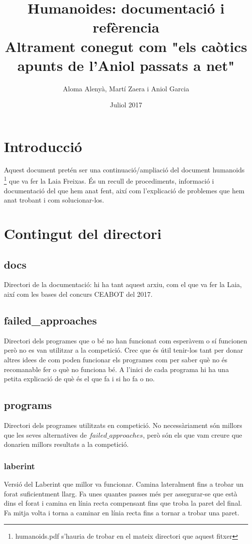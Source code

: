 \documentclass{article}
\title{Humanoides: documentació i refèrencia \\ \small{Altrament conegut com "els caòtics apunts de l'Aniol passats a net"}}
\author{Aloma Alenyà, Martí Zaera i Aniol Garcia}
\date{Juliol 2017}
\begin{document}
\maketitle
\section{Introducció}
Aquest document pretén ser una continuació/ampliació del document humanoids \footnote{humanoids.pdf s'hauria de trobar en el mateix directori que aquest fitxer} que va fer la Laia Freixas. És un recull de procediments, informació i documentació del que hem anat fent, així com l'explicació de problemes que hem anat trobant i com solucionar-los. 
\section{Contingut del directori}
\subsection{docs}
Directori de la documentació: hi ha tant aquest arxiu, com el que va fer la Laia, així com les bases del concurs CEABOT del 2017.
\subsection{failed\_approaches}
Directori dels programes que o bé no han funcionat com esperàvem o sí funcionen però no es van utilitzar a la competició. Crec que és útil tenir-los tant per donar altres idees de com poden funcionar els programes com per saber què no és recomanable fer o què no funciona bé. A l'inici de cada programa hi ha una petita explicació de què és el que fa i si ho fa o no.
\subsection{programs}
Directori dels programes utilitzats en competició. No necessàriament són millors que les seves alternatives de $failed\_approaches$, però són els que vam creure que donarien millors resultats a la competició.
\subsubsection{laberint}
Versió del Laberint que millor va funcionar. Camina lateralment fins a trobar un forat suficientment llarg. Fa unes quantes passes més per assegurar-se que està dins el forat i camina en línia recta compensant fins que troba la paret del final. Fa mitja volta i torna a caminar en línia recta fins a tornar a trobar una paret.
\end{document}
